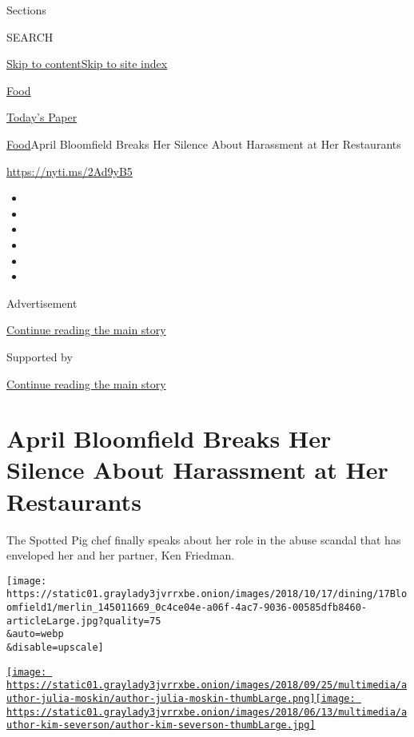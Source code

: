 Sections

SEARCH

\protect\hyperlink{site-content}{Skip to
content}\protect\hyperlink{site-index}{Skip to site index}

\href{https://www.nytimes3xbfgragh.onion/section/food}{Food}

\href{https://myaccount.nytimes3xbfgragh.onion/auth/login?response_type=cookie\&client_id=vi}{}

\href{https://www.nytimes3xbfgragh.onion/section/todayspaper}{Today's
Paper}

\href{/section/food}{Food}\textbar{}April Bloomfield Breaks Her Silence
About Harassment at Her Restaurants

\url{https://nyti.ms/2Ad9yB5}

\begin{itemize}
\item
\item
\item
\item
\item
\item
\end{itemize}

Advertisement

\protect\hyperlink{after-top}{Continue reading the main story}

Supported by

\protect\hyperlink{after-sponsor}{Continue reading the main story}

\hypertarget{april-bloomfield-breaks-her-silence-about-harassment-at-her-restaurants}{%
\section{April Bloomfield Breaks Her Silence About Harassment at Her
Restaurants}\label{april-bloomfield-breaks-her-silence-about-harassment-at-her-restaurants}}

The Spotted Pig chef finally speaks about her role in the abuse scandal
that has enveloped her and her partner, Ken Friedman.

\texttt{[image: https://static01.graylady3jvrrxbe.onion/images/2018/10/17/dining/17Bloomfield1/merlin\_145011669\_0c4ce04e-a06f-4ac7-9036-00585dfb8460-articleLarge.jpg?quality=75\\\&auto=webp\\\&disable=upscale]}

\href{https://www.nytimes3xbfgragh.onion/by/julia-moskin}{\texttt{[image: https://static01.graylady3jvrrxbe.onion/images/2018/09/25/multimedia/author-julia-moskin/author-julia-moskin-thumbLarge.png]}}\href{https://www.nytimes3xbfgragh.onion/by/kim-severson}{\texttt{[image: https://static01.graylady3jvrrxbe.onion/images/2018/06/13/multimedia/author-kim-severson/author-kim-severson-thumbLarge.jpg]}}

